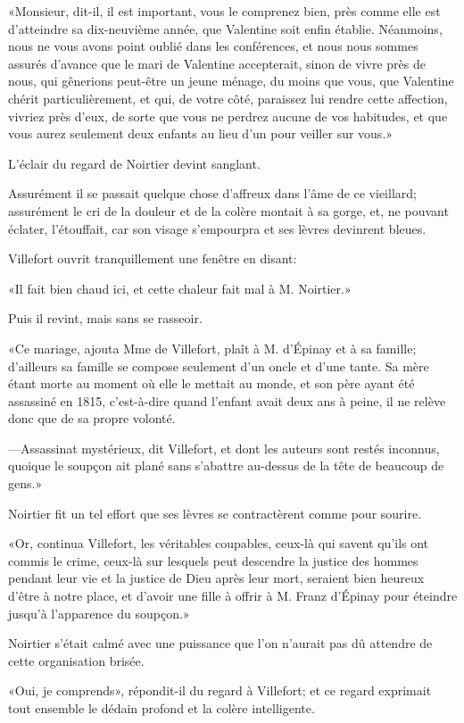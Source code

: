 «Monsieur, dit-il, il est important, vous le comprenez bien, près comme elle est d'atteindre sa dix-neuvième année, que Valentine soit enfin établie. Néanmoins, nous ne vous avons point oublié dans les conférences, et nous nous sommes assurés d'avance que le mari de Valentine accepterait, sinon de vivre près de nous, qui gênerions peut-être un jeune ménage, du moins que vous, que Valentine chérit particulièrement, et qui, de votre côté, paraissez lui rendre cette affection, vivriez près d'eux, de sorte que vous ne perdrez aucune de vos habitudes, et que vous aurez seulement deux enfants au lieu d'un pour veiller sur vous.» 

L'éclair du regard de Noirtier devint sanglant. 

Assurément il se passait quelque chose d'affreux dans l'âme de ce vieillard; assurément le cri de la douleur et de la colère montait à sa gorge, et, ne pouvant éclater, l'étouffait, car son visage s'empourpra et ses lèvres devinrent bleues. 

Villefort ouvrit tranquillement une fenêtre en disant: 

«Il fait bien chaud ici, et cette chaleur fait mal à M. Noirtier.» 

Puis il revint, mais sans se rasseoir. 

«Ce mariage, ajouta Mme de Villefort, plaît à M. d'Épinay et à sa famille; d'ailleurs sa famille se compose seulement d'un oncle et d'une tante. Sa mère étant morte au moment où elle le mettait au monde, et son père ayant été assassiné en 1815, c'est-à-dire quand l'enfant avait deux ans à peine, il ne relève donc que de sa propre volonté. 

—Assassinat mystérieux, dit Villefort, et dont les auteurs sont restés inconnus, quoique le soupçon ait plané sans s'abattre au-dessus de la tête de beaucoup de gens.» 

Noirtier fit un tel effort que ses lèvres se contractèrent comme pour sourire. 

«Or, continua Villefort, les véritables coupables, ceux-là qui savent qu'ils ont commis le crime, ceux-là sur lesquels peut descendre la justice des hommes pendant leur vie et la justice de Dieu après leur mort, seraient bien heureux d'être à notre place, et d'avoir une fille à offrir à M. Franz d'Épinay pour éteindre jusqu'à l'apparence du soupçon.» 

Noirtier s'était calmé avec une puissance que l'on n'aurait pas dû attendre de cette organisation brisée. 

«Oui, je comprends», répondit-il du regard à Villefort; et ce regard exprimait tout ensemble le dédain profond et la colère intelligente. 

